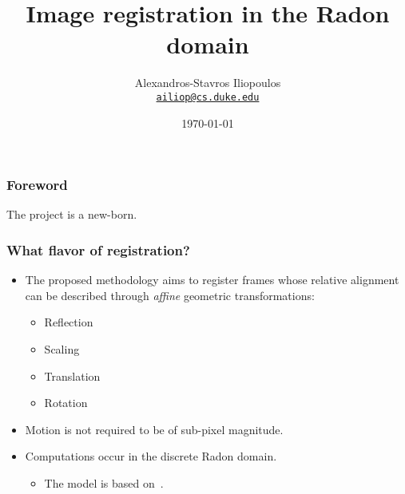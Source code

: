 \documentclass[12pt,x11names]{beamer}
\title{\textbf{Image registration in the Radon domain}}
\author[A. S. Iliopoulos]{Alexandros-Stavros Iliopoulos\\
  \href{mailto:ailiop@cs.duke.edu}{\texttt{ailiop@cs.duke.edu}}}
\institute[Duke University]{Duke University}
\date{\today}
\begin{document}
\def\newblock{\hskip .11em plus .33em minus .07em}


\begin{frame}
\titlepage
\end{frame}


\begin{frame}
  \frametitle{Foreword}
  
  The project is a new-born.

\end{frame}


\begin{frame}
  \frametitle{What flavor of registration?}

  \begin{itemize}

  \item The proposed methodology aims to register frames whose relative
    alignment can be described through \emph{affine} geometric
    transformations:
    \begin{itemize}
    \item Reflection
    \item Scaling
    \item Translation
    \item Rotation
    \end{itemize}

  \item Motion is not required to be of sub-pixel magnitude.

  \item Computations occur in the discrete Radon domain.
    \begin{itemize}
    \item The model is based on~\cite{hjouj_identification_2008}.
    \end{itemize}

  \end{itemize}
\end{frame}
\end{document}
